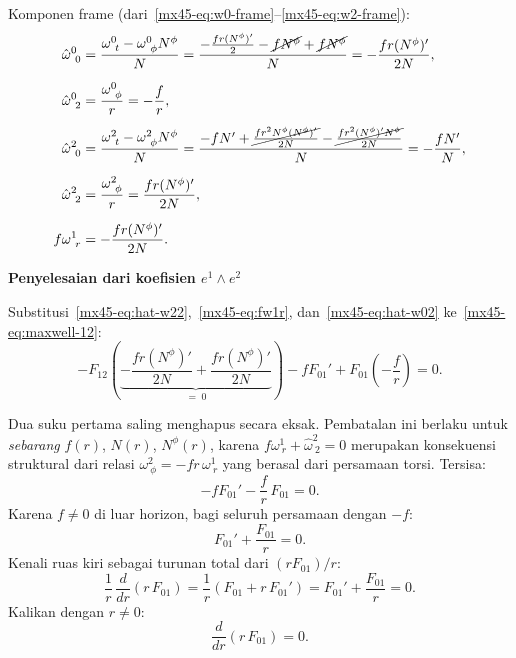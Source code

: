 Komponen frame (dari~\eqref{mx45-eq:w0-frame}--\eqref{mx45-eq:w2-frame}):
\begin{align}
    \hat\omega^0_{\ 0} &= \frac{\omega^0_{\ t} - \omega^0_{\ \phi}N^\phi}{N}
    = \frac{-\frac{fr(N^\phi)'}{2} - \cancel{fN^\phi} + \cancel{fN^\phi}}{N}
    = -\frac{fr(N^\phi)'}{2N}, \label{mx45-eq:hat-w00}\\[6pt]
    \hat\omega^0_{\ 2} &= \frac{\omega^0_{\ \phi}}{r} = -\frac{f}{r}, \label{mx45-eq:hat-w02}\\[6pt]
    \hat\omega^2_{\ 0} &= \frac{\omega^2_{\ t} - \omega^2_{\ \phi}N^\phi}{N}
    = \frac{-fN' + \cancel{\frac{fr^2N^\phi(N^\phi)'}{2N}} - \cancel{\frac{fr^2(N^\phi)'N^\phi}{2N}}}{N}
    = -\frac{fN'}{N}, \label{mx45-eq:hat-w20}\\[6pt]
    \hat\omega^2_{\ 2} &= \frac{\omega^2_{\ \phi}}{r} = \frac{fr(N^\phi)'}{2N}, \label{mx45-eq:hat-w22}\\[6pt]
    f\omega^1_{\ r} &= -\frac{fr(N^\phi)'}{2N}. \label{mx45-eq:fw1r}
\end{align}

\vspace{0.5em}
\noindent \textbf{Penyelesaian dari koefisien $e^1 \wedge e^2$}

Substitusi~\eqref{mx45-eq:hat-w22},~\eqref{mx45-eq:fw1r}, dan~\eqref{mx45-eq:hat-w02} ke~\eqref{mx45-eq:maxwell-12}:
\begin{equation}
    -F_{12}\!\left(\underbrace{-\frac{fr(N^\phi)'}{2N} + \frac{fr(N^\phi)'}{2N}}_{= \; 0}\right)
    - fF_{01}' + F_{01}\!\left(-\frac{f}{r}\right) = 0.
\end{equation}

Dua suku pertama saling menghapus secara eksak. Pembatalan ini berlaku untuk \emph{sebarang} $f(r)$, $N(r)$, $N^\phi(r)$, karena $f\omega^1_{\ r} + \hat\omega^2_{\ 2} = 0$ merupakan konsekuensi struktural dari relasi $\omega^2_{\ \phi} = -fr\,\omega^1_{\ r}$ yang berasal dari persamaan torsi. Tersisa:
\begin{equation}
    -fF_{01}' - \frac{f}{r}\,F_{01} = 0.
\end{equation}
Karena $f \neq 0$ di luar horizon, bagi seluruh persamaan dengan $-f$:
\begin{equation}
    F_{01}' + \frac{F_{01}}{r} = 0.
\end{equation}
Kenali ruas kiri sebagai turunan total dari $(rF_{01})/r$:
\begin{equation}
    \frac{1}{r}\,\frac{d}{dr}(r\,F_{01})
    = \frac{1}{r}\!\left(F_{01} + r\,F_{01}'\right)
    = F_{01}' + \frac{F_{01}}{r} = 0.
\end{equation}
Kalikan dengan $r \neq 0$:
\begin{equation}
    \frac{d}{dr}(r\,F_{01}) = 0.
\end{equation}

